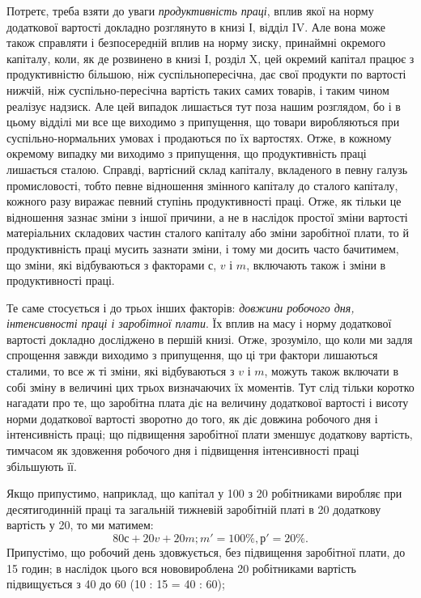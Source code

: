 Потретє, треба взяти до уваги \emph{продуктивність праці}, вплив
якої на норму додаткової вартості докладно розглянуто в книзі І,
відділ IV. Але вона може також справляти і безпосередній
вплив на норму зиску, принаймні окремого капіталу, коли, як
де розвинено в книзі І, розділ X, цей окремий
капітал працює з продуктивністю більшою, ніж суспільнопересічна,
дає свої продукти по вартості нижчій, ніж суспільно-пересічна
вартість таких самих товарів, і таким чином
реалізує надзиск. Але цей випадок лишається тут поза нашим
розглядом, бо і в цьому відділі ми все ще виходимо з припущення,
що товари виробляються при суспільно-нормальних
умовах і продаються по їх вартостях. Отже, в кожному окремому
випадку ми виходимо з припущення, що продуктивність
праці лишається сталою. Справді, вартісний склад капіталу,
вкладеного в певну галузь промисловості, тобто певне відношення
змінного капіталу до сталого капіталу, кожного разу
виражає певний ступінь продуктивності праці. Отже, як тільки
це відношення зазнає зміни з іншої причини, а не в наслідок
простої зміни вартості матеріальних складових частин сталого
капіталу або зміни заробітної плати, то й продуктивність праці
мусить зазнати зміни, і тому ми досить часто бачитимем, що
зміни, які відбуваються з факторами $с$, $v$ і $m$, включають також
і зміни в продуктивності праці.

Те саме стосується і до трьох інших факторів: \emph{довжини робочого
дня, інтенсивності праці і заробітної плати}. Їх вплив
на масу і норму додаткової вартості докладно досліджено в першій
книзі. Отже, зрозуміло, що коли ми задля спрощення завжди
виходимо з припущення, що ці три фактори лишаються сталими,
то все ж ті зміни, які відбуваються з $v$ і $m$, можуть також включати
в собі зміну в величині цих трьох визначаючих їх моментів.
Тут слід тільки коротко нагадати про те, що заробітна плата
діє на величину додаткової вартості і висоту норми додаткової
вартості зворотно до того, як діє довжина робочого дня і інтенсивність
праці; що підвищення заробітної плати зменшує додаткову
вартість, тимчасом як здовження робочого дня і підвищення
інтенсивності праці збільшують її.

Якщо припустимо, наприклад, що капітал у 100 з 20 робітниками
виробляє при десятигодинній праці та загальній тижневій
заробітній платі в 20 додаткову вартість у 20, то ми
матимем:\[
80 с + 20 v + 20 m; m' = 100\%, р' = 20\%.
\]
Припустімо, що робочий день здовжується, без підвищення
заробітної плати, до 15 годин; в наслідок цього вся нововироблена
20 робітниками вартість підвищується з 40 до 60 (10 : 15 = 40 : 60);
\parbreak{}  %
